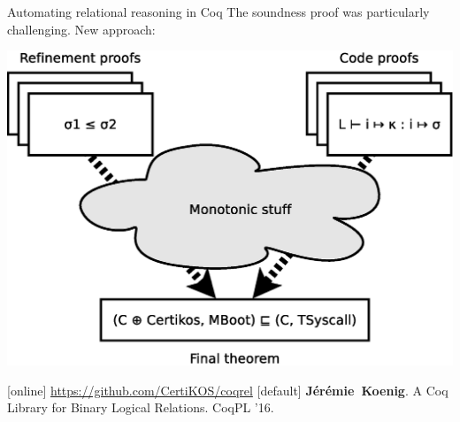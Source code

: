 \documentclass[aspectratio=141]{beamer}
\newcommand{\fme}{\textbf{J\'er\'emie~Koenig}}
\begin{document}
\begin{frame}{Automating relational reasoning in Coq} %
  The soundness proof was particularly challenging.
  \pause
  New approach:
  \begin{center}
    \includegraphics[scale=0.35]{fig/overview}
  \end{center}
  \pause
  \begin{thebibliography}{10}
    [online]
      \url{https://github.com/CertiKOS/coqrel}
    [default]
      \fme.
      \newblock
      A Coq Library for Binary Logical Relations.
      \newblock
      CoqPL '16.
  \end{thebibliography}
\end{frame}
\end{document}
